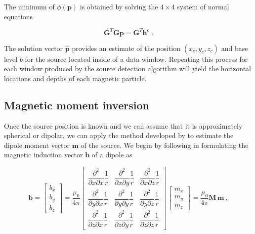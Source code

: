 The minimum of $\phi(\mathbf{p})$ is obtained by solving the $4 \times 4$
system of normal equations

\begin{equation}
\mathbf{G}^T \mathbf{G} \mathbf{p} = \mathbf{G}^T \mathbf{h}^o\ .
\end{equation}

The solution vector $\hat{\mathbf{p}}$ provides an estimate of the position
$(x_c, y_c, z_c)$ and base level $b$ for the source located inside of a data
window. Repeating this process for each window produced by the source detection
algorithm will yield the horizontal locations and depths of each magnetic
particle.

\subsection{Magnetic moment inversion}

Once the source position is known and we can assume that it is approximately
spherical or dipolar, we can apply the method developed by
\citet{Oliveira2015Estimation} to estimate the dipole moment vector
$\mathbf{m}$ of the source. We begin by following
\citet{Oliveira2015Estimation} in formulating the magnetic induction vector
$\mathbf{b}$ of a dipole as

\begin{equation}
\label{eq_vector_dipole_field}
\mathbf{b}
=
\begin{bmatrix}
  b_x \\ b_y \\ b_z
\end{bmatrix}
= \dfrac{\mu_0}{4\pi}
\begin{bmatrix}
    \dfrac{\partial^2}{\partial x \partial x} \dfrac{1}{r}
  & \dfrac{\partial^2}{\partial x \partial y} \dfrac{1}{r}
  & \dfrac{\partial^2}{\partial x \partial z} \dfrac{1}{r}
  \\
    \dfrac{\partial^2}{\partial y \partial x} \dfrac{1}{r}
  & \dfrac{\partial^2}{\partial y \partial y} \dfrac{1}{r}
  & \dfrac{\partial^2}{\partial y \partial z} \dfrac{1}{r}
  \\
  \dfrac{\partial^2}{\partial z \partial x} \dfrac{1}{r}
  & \dfrac{\partial^2}{\partial z \partial y} \dfrac{1}{r}
  & \dfrac{\partial^2}{\partial z \partial z} \dfrac{1}{r}
\end{bmatrix}
\begin{bmatrix}
  m_x \\ m_y \\ m_z
\end{bmatrix}
= \dfrac{\mu_0}{4\pi} \mathbf{M}\,\mathbf{m}
\ ,
\end{equation}

